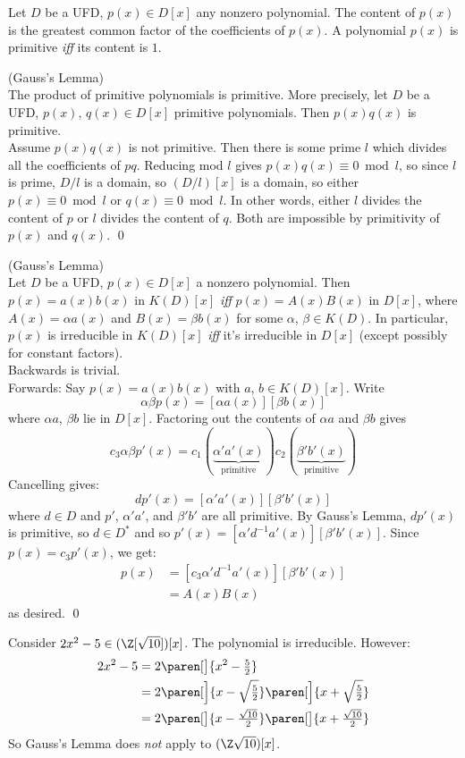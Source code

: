  Let $D$ be a UFD, $p(x)\in D[x]$ any nonzero polynomial.  The content of $p(x)$ is the greatest common factor of the coefficients of $p(x)$.  A polynomial $p(x)$ is primitive \emph{iff} its content is $1$.

\thm (Gauss's Lemma) \\
The product of primitive polynomials is primitive.  More precisely, let $D$ be a UFD, $p(x)$, $q(x)\in D[x]$ primitive polynomials.  Then $p(x)q(x)$ is primitive. \\
\pf Assume $p(x)q(x)$ is not primitive.  Then there is some prime $l$ which divides all the coefficients of $pq$.  Reducing mod $l$ gives $p(x)q(x)\equiv0\bmod l$, so since $l$ is prime, $D/l$ is a domain, so $(D/l)[x]$ is a domain, so either $p(x)\equiv0\bmod l$ or $q(x)\equiv0\bmod l$.  In other words, either $l$ divides the content of $p$ or $l$ divides the content of $q$.  Both are impossible by primitivity of $p(x)$ and $q(x)$. \qed

\thm (Gauss's Lemma) \\
Let $D$ be a UFD, $p(x)\in D[x]$ a nonzero polynomial.  Then $p(x)=a(x)b(x)$ in $K(D)[x]$ \emph{iff} $p(x)=A(x)B(x)$ in $D[x]$, where $A(x)=\alpha a(x)$ and $B(x)=\beta b(x)$ for some $\alpha$, $\beta\in K(D)$.  In particular, $p(x)$ is irreducible in $K(D)[x]$ \emph{iff} it's irreducible in $D[x]$ (except possibly for constant factors). \\
\pf Backwards is trivial. \\
Forwards: Say $p(x)=a(x)b(x)$ with $a$, $b\in K(D)[x]$.  Write
\[ \alpha \beta p(x) = [\alpha a(x)] [\beta b(x)] \]
where $\alpha a$, $\beta b$ lie in $D[x]$.  Factoring out the contents of $\alpha a$ and $\beta b$ gives
\[ c_3 \alpha \beta p'(x) = c_1 (\underbrace{\alpha' a'(x)}_{\text{primitive}}) c_2 (\underbrace{\beta' b'(x)}_{\text{primitive}}) \]
Cancelling gives:
\[ d p'(x) = [\alpha' a'(x)] [\beta' b'(x)] \]
where $d\in D$ and $p'$, $\alpha' a'$, and $\beta' b'$ are all primitive.  By Gauss's Lemma, $dp'(x)$ is primitive, so $d\in D^*$ and so $p'(x)=[\alpha'd^{-1}a'(x)][\beta'b'(x)]$.  Since $p(x)=c_3p'(x)$, we get:
\begin{align*}
p(x) &= [c_3\alpha'd^{-1}a'(x)][\beta' b'(x)] \\
&= A(x) B(x)
\end{align*}
as desired. \qed

\eg Consider $2x^2-5\in(\Z[\sqrt{10}])[x]$.  The polynomial is irreducible.  However:
\begin{align*}
2x^2-5 &= 2\paren[\big]{x^2-\tfrac52} \\
&= 2\paren[\Big]{x-\sqrt{\tfrac52}}\paren[\Big]{x+\sqrt{\tfrac52}} \\
&= 2\paren[\big]{x-\tfrac{\sqrt{10}}{2}}\paren[\big]{x+\tfrac{\sqrt{10}}{2}}
\end{align*}
So Gauss's Lemma does \emph{not} apply to $(\Z\sqrt{10})[x]$.

